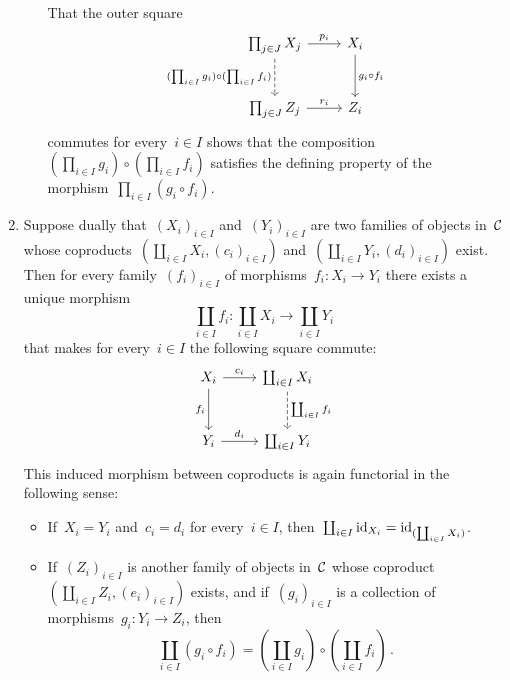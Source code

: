 \begin{remark*}
\begin{enumerate}
\begin{itemize}
          That the outer square
          \[
            \begin{tikzcd}[row sep = large]
                \prod_{j \in J} X_j
                \arrow{r}[above]{p_i}
                \arrow[dashed]{d}[left]{(\prod_{i \in I} g_i) \circ (\prod_{i \in I} f_i)}
              & X_i
                \arrow{d}[right]{g_i \circ f_i}
              \\
                \prod_{j \in J} Z_j
                \arrow{r}[above]{r_i}
              & Z_i
            \end{tikzcd}
          \]
          commutes for every~$i \in I$ shows that the composition~$(\prod_{i \in I} g_i) \circ (\prod_{i \in I} f_i)$ satisfies the defining property of the morphism~$\prod_{i \in I} (g_i \circ f_i)$.
      \end{itemize}
    \item
      Suppose dually that~$(X_i)_{i \in I}$ and~$(Y_i)_{i \in I}$ are two families of objects in~$\mathcal{C}$ whose coproducts~$(\coprod_{i \in I} X_i, (c_i)_{i \in I})$ and~$(\coprod_{i \in I} Y_i, (d_i)_{i \in I})$ exist.
      Then for every family~$(f_i)_{i \in I}$ of morphisms~$f_i \colon X_i \to Y_i$ there exists a unique morphism
      \[
        \coprod_{i \in I} f_i
        \colon
        \coprod_{i \in I} X_i
        \to
        \coprod_{i \in I} Y_i
      \]
      that makes for every~$i \in I$ the following square commute:
      \[
         \begin{tikzcd}[row sep = large]
            X_i
            \arrow{r}[above]{c_i}
            \arrow{d}[left]{f_i}
          & \coprod_{i \in I} X_i
            \arrow[dashed]{d}[right]{\coprod_{i \in I} f_i}
          \\
            Y_i
            \arrow{r}[above]{d_i}
          & \coprod_{i \in I} Y_i
        \end{tikzcd}
      \]
      This induced morphism between coproducts is again functorial in the following sense:
      \begin{itemize}
        \item
          If~$X_i = Y_i$ and~$c_i = d_i$ for every~$i \in I$, then~$\coprod_{i \in I} \operatorname{id}_{X_i} = \operatorname{id}_{(\coprod_{i \in I} X_i)}$.
        \item
          If~$(Z_i)_{i \in I}$ is another family of objects in~$\mathcal{C}$ whose coproduct~$(\coprod_{i \in I} Z_i, (e_i)_{i \in I})$ exists, and if~$(g_i)_{i \in I}$ is a collection of morphisms~$g_i \colon Y_i \to Z_i$, then
          \[
              \coprod_{i \in I} (g_i \circ f_i)
            =       \left( \coprod_{i \in I} g_i \right)
              \circ \left( \coprod_{i \in I} f_i \right) \,.
          \]
      \end{itemize}
  \end{enumerate}
\end{remark*}




